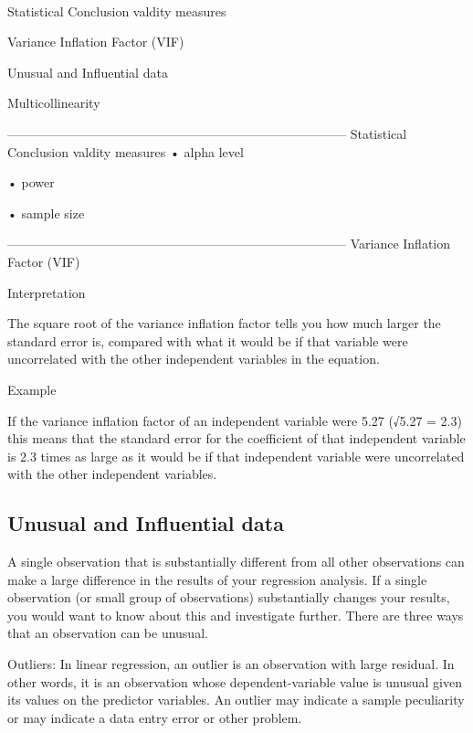 
 

 



Statistical Conclusion valdity measures

Variance Inflation Factor (VIF)

Unusual and Influential data

Multicollinearity


--------------------------------------------------------------------------------
 Statistical Conclusion valdity measures
•
alpha level

•
power

•
sample size


 


--------------------------------------------------------------------------------
Variance Inflation Factor (VIF)

Interpretation

The square root of the variance inflation factor tells you how much larger the standard error is, compared with what it would be if that variable were uncorrelated with the other independent variables in the equation.

 

Example

If the variance inflation factor of an independent variable were 5.27 (√5.27 = 2.3) this means that the standard error for the coefficient of that independent variable is 2.3 times as large as it would be if that independent variable were uncorrelated with the other independent variables.

 

 


\subsection*{Unusual and Influential data}

A single observation that is substantially different from all other observations can make a large difference in the results of your regression analysis.  If a single observation (or small group of observations) substantially changes your results, you would want to know about this and investigate further.  There are three ways that an observation can be unusual.

 

Outliers: In linear regression, an outlier is an observation with large residual. In other words, it is an observation whose dependent-variable value is unusual given its values on the predictor variables. An outlier may indicate a sample peculiarity or may indicate a data entry error or other problem.

